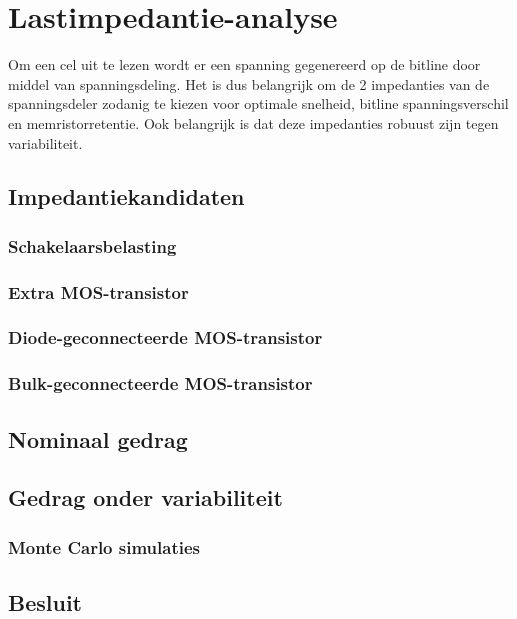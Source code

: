 \chapter{Lastimpedantie-analyse}
\label{loadanalysis}
Om een cel uit te lezen wordt er een spanning gegenereerd op de bitline door middel van spanningsdeling.
Het is dus belangrijk om de 2 impedanties van de spanningsdeler zodanig te kiezen voor optimale snelheid, bitline spanningsverschil en memristorretentie.
Ook belangrijk is dat deze impedanties robuust zijn tegen variabiliteit.

\section{Impedantiekandidaten}

\subsection{Schakelaarsbelasting}

\subsection{Extra MOS-transistor}

\subsection{Diode-geconnecteerde MOS-transistor}

\subsection{Bulk-geconnecteerde MOS-transistor}

\section{Nominaal gedrag}

\section{Gedrag onder variabiliteit}

\subsection{Monte Carlo simulaties}

\section{Besluit}

